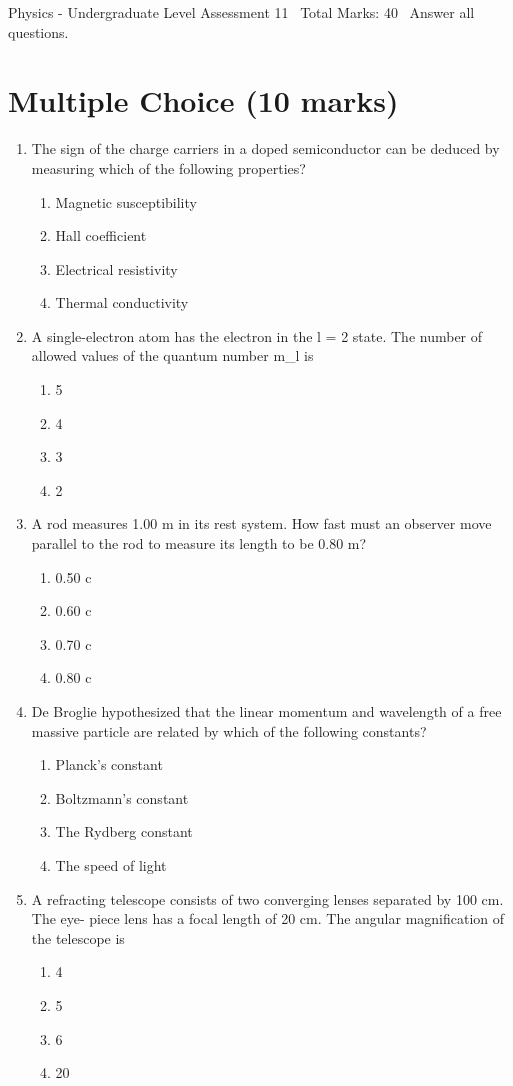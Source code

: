 \documentclass[12pt]{article}
\begin{document}
\begin{center}
Physics - Undergraduate Level Assessment 11 \
Total Marks: 40 \
Answer all questions.
\end{center}

\section*{Multiple Choice (10 marks)}
\begin{enumerate}[label=\arabic*.]
\item The sign of the charge carriers in a doped semiconductor can be deduced by measuring which of the following properties?
\begin{enumerate}[label=(\alph*)]
    \item Magnetic susceptibility
    \item Hall coefficient
    \item Electrical resistivity
    \item Thermal conductivity
\end{enumerate}
\item A single-electron atom has the electron in the l = 2 state. The number of allowed values of the quantum number m\_l is
\begin{enumerate}[label=(\alph*)]
    \item 5
    \item 4
    \item 3
    \item 2
\end{enumerate}
\item A rod measures 1.00 m in its rest system. How fast must an observer move parallel to the rod to measure its length to be 0.80 m?
\begin{enumerate}[label=(\alph*)]
    \item 0.50 c
    \item 0.60 c
    \item 0.70 c
    \item 0.80 c
\end{enumerate}
\item De Broglie hypothesized that the linear momentum and wavelength of a free massive particle are related by which of the following constants?
\begin{enumerate}[label=(\alph*)]
    \item Planck's constant
    \item Boltzmann's constant
    \item The Rydberg constant
    \item The speed of light
\end{enumerate}
\item A refracting telescope consists of two converging lenses separated by 100 cm. The eye- piece lens has a focal length of 20 cm. The angular magnification of the telescope is
\begin{enumerate}[label=(\alph*)]
    \item 4
    \item 5
    \item 6
    \item 20
\end{enumerate}
\end{enumerate}
\end{document}

